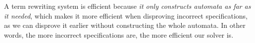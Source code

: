 \documentclass[acmsmall,10pt,review]{acmart}
\begin{document}
{A term rewriting system is efficient because \emph{it only constructs automata as far as it needed}, which makes it more efficient when disproving incorrect specifications, as we can disprove it earlier without constructing the whole automata. In other words, the more incorrect specifications are, the more efficient our solver is.

%
%
%
%
%
%
%


}
\end{document}
